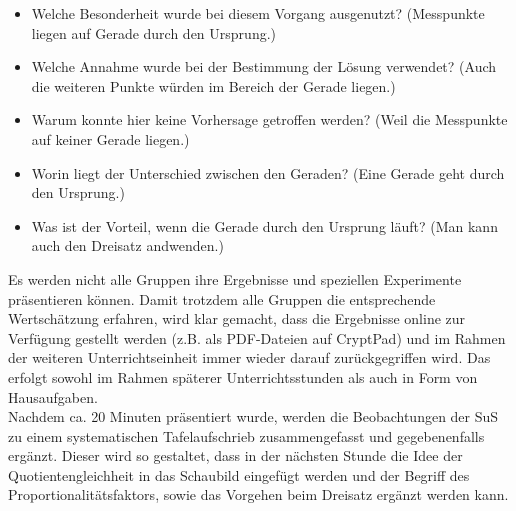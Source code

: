 \documentclass[../main.tex]{subfiles}
\begin{document}
\begin{itemize}
    \item Welche Besonderheit wurde bei diesem Vorgang ausgenutzt? (Messpunkte liegen auf Gerade durch den Ursprung.)
    \item Welche Annahme wurde bei der Bestimmung der Lösung verwendet? (Auch die weiteren Punkte würden im Bereich der Gerade liegen.)
    \item Warum konnte hier keine Vorhersage getroffen werden? (Weil die Messpunkte auf keiner Gerade liegen.)
    \item Worin liegt der Unterschied zwischen den Geraden? (Eine Gerade geht durch den Ursprung.)
    \item Was ist der Vorteil, wenn die Gerade durch den Ursprung läuft? (Man kann auch den Dreisatz andwenden.)
\end{itemize}
Es werden nicht alle Gruppen ihre Ergebnisse und speziellen Experimente präsentieren können. Damit trotzdem alle Gruppen die entsprechende Wertschätzung erfahren, wird klar gemacht, dass die Ergebnisse online zur Verfügung gestellt werden (z.B. als PDF-Dateien auf CryptPad) und im Rahmen der weiteren Unterrichtseinheit immer wieder darauf zurückgegriffen wird. Das erfolgt sowohl im Rahmen späterer Unterrichtsstunden als auch in Form von Hausaufgaben.\\
Nachdem ca. 20 Minuten präsentiert wurde, werden die Beobachtungen der SuS zu einem systematischen Tafelaufschrieb zusammengefasst und gegebenenfalls ergänzt. Dieser wird so gestaltet, dass in der nächsten Stunde die Idee der Quotientengleichheit in das Schaubild eingefügt werden und der Begriff des Proportionalitätsfaktors, sowie das Vorgehen beim Dreisatz ergänzt werden kann.
\end{document}
